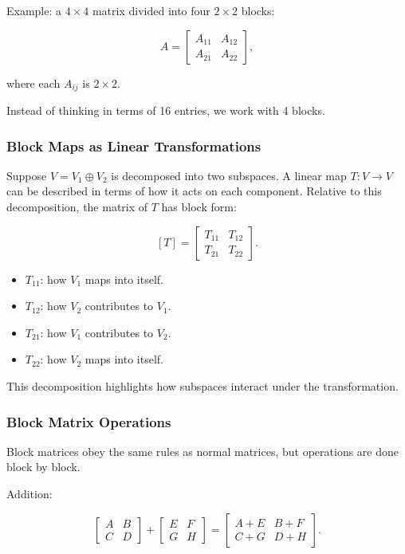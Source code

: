 \documentclass[
  letterpaper,
  DIV=11,
  numbers=noendperiod]{scrreprt}
\providecommand{\tightlist}{%
  \setlength{\itemsep}{0pt}\setlength{\parskip}{0pt}}
\begin{document}
Example: a \(4 \times 4\) matrix divided into four \(2 \times 2\)
blocks:

\[
A = \begin{bmatrix} 
A_{11} & A_{12} \\ 
A_{21} & A_{22} 
\end{bmatrix},
\]

where each \(A_{ij}\) is \(2 \times 2\).

Instead of thinking in terms of 16 entries, we work with 4 blocks.

\subsubsection{Block Maps as Linear
Transformations}\label{block-maps-as-linear-transformations}

Suppose \(V = V_1 \oplus V_2\) is decomposed into two subspaces. A
linear map \(T: V \to V\) can be described in terms of how it acts on
each component. Relative to this decomposition, the matrix of \(T\) has
block form:

\[
[T] = \begin{bmatrix} 
T_{11} & T_{12} \\ 
T_{21} & T_{22} 
\end{bmatrix}.
\]

\begin{itemize}
\tightlist
\item
  \(T_{11}\): how \(V_1\) maps into itself.
\item
  \(T_{12}\): how \(V_2\) contributes to \(V_1\).
\item
  \(T_{21}\): how \(V_1\) contributes to \(V_2\).
\item
  \(T_{22}\): how \(V_2\) maps into itself.
\end{itemize}

This decomposition highlights how subspaces interact under the
transformation.

\subsubsection{Block Matrix Operations}\label{block-matrix-operations}

Block matrices obey the same rules as normal matrices, but operations
are done block by block.

Addition:

\[
\begin{bmatrix} A & B \\ C & D \end{bmatrix} + 
\begin{bmatrix} E & F \\ G & H \end{bmatrix} =
\begin{bmatrix} A+E & B+F \\ C+G & D+H \end{bmatrix}.
\]
\end{document}
